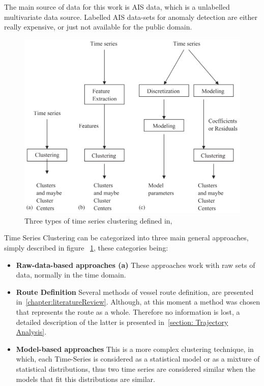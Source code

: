The main source of data for this work is AIS data, which is a  unlabelled multivariate data source. Labelled AIS data-sets for anomaly detection are either really expensive, or just not available for the public domain.  


\begin{figure}[H]
	\centering
	\includegraphics[scale = .6]{figures/TimeSeriesClustering}
    \caption{Three types of time series clustering defined in, ~\cite{WarrenLiao2005}}
    \label{fig:TimeSeriesClustering}
\end{figure}

Time Series Clustering can be categorized into three main general approaches, simply described in figure ~\ref{fig:TimeSeriesClustering}, these categories being:

\begin{itemize}
\item \textbf{Raw-data-based approaches (a)} These approaches work with raw sets of data, normally in the time domain. 

\item \textbf{Route Definition} Several methods of vessel route definition, are presented in~\ref{chapter:literatureReview}.
Although, at this moment a method was chosen that represents the route as a whole. Therefore no information is lost, a detailed description of the latter is presented in~\ref{section: Trajectory Analysis}.

\item \textbf{Model-based approaches} This is a more complex clustering technique, in which, each Time-Series is considered as a statistical model or as a mixture of statistical distributions, thus two time series are considered similar when the models that fit this distributions are similar. 
\end{itemize}


